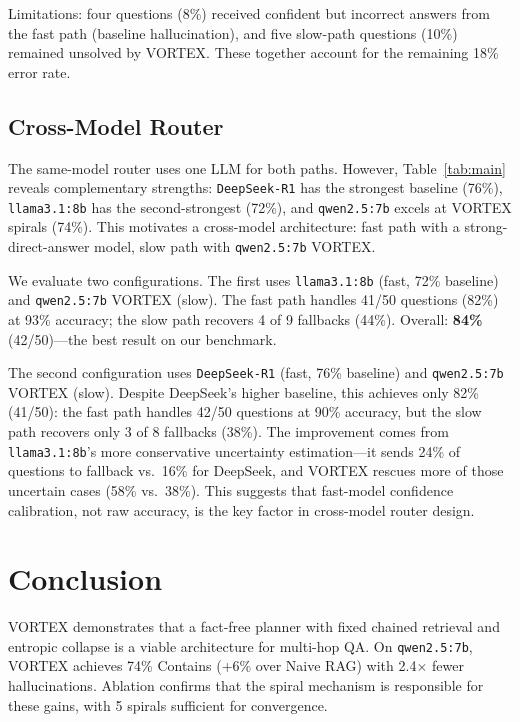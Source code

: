 \documentclass{zapiski}
\begin{document}
Limitations: four questions (8\%) received confident but incorrect answers from the fast path (baseline hallucination), and five slow-path questions (10\%) remained unsolved by VORTEX. These together account for the remaining 18\% error rate.

\subsection{Cross-Model Router}

The same-model router uses one LLM for both paths. However, Table~\ref{tab:main} reveals complementary strengths: \texttt{DeepSeek-R1} has the strongest baseline (76\%), \texttt{llama3.1:8b} has the second-strongest (72\%), and \texttt{qwen2.5:7b} excels at VORTEX spirals (74\%). This motivates a cross-model architecture: fast path with a strong-direct-answer model, slow path with \texttt{qwen2.5:7b} VORTEX.

We evaluate two configurations. The first uses \texttt{llama3.1:8b} (fast, 72\% baseline) and \texttt{qwen2.5:7b} VORTEX (slow). The fast path handles 41/50 questions (82\%) at 93\% accuracy; the slow path recovers 4 of 9 fallbacks (44\%). Overall: \textbf{84\%} (42/50)---the best result on our benchmark.

The second configuration uses \texttt{DeepSeek-R1} (fast, 76\% baseline) and \texttt{qwen2.5:7b} VORTEX (slow). Despite DeepSeek's higher baseline, this achieves only 82\% (41/50): the fast path handles 42/50 questions at 90\% accuracy, but the slow path recovers only 3 of 8 fallbacks (38\%). The improvement comes from \texttt{llama3.1:8b}'s more conservative uncertainty estimation---it sends 24\% of questions to fallback vs.\ 16\% for DeepSeek, and VORTEX rescues more of those uncertain cases (58\% vs.\ 38\%). This suggests that fast-model confidence calibration, not raw accuracy, is the key factor in cross-model router design.

\section{Conclusion}
\label{sec:conclusion}

VORTEX demonstrates that a fact-free planner with fixed chained retrieval and entropic collapse is a viable architecture for multi-hop QA. On \texttt{qwen2.5:7b}, VORTEX achieves 74\% Contains (+6\% over Naive RAG) with 2.4$\times$ fewer hallucinations. Ablation confirms that the spiral mechanism is responsible for these gains, with 5 spirals sufficient for convergence.
\end{document}
